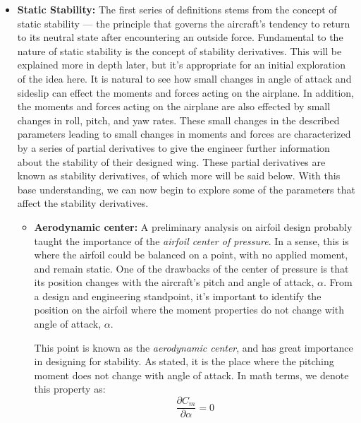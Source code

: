\documentclass{article}
\begin{document}
\begin{itemize}
    \item[] \textbf{Static Stability:}
    The first series of definitions stems from the concept of static stability --- the principle that governs the aircraft's tendency to return to its neutral state after encountering an outside force. Fundamental to the nature of static stability is the concept of stability derivatives. This will be explained more in depth later, but it's appropriate for an initial exploration of the idea here.
    It is natural to see how small changes in angle of attack and sideslip can effect the moments and forces acting on the airplane. In addition, the moments and forces acting on the airplane are also effected by small changes in roll, pitch, and yaw rates. These small changes in the described parameters leading to small changes in moments and forces are characterized by a series of partial derivatives to give the engineer further information about the stability of their designed wing.
    These partial derivatives are known as stability derivatives, of which more will be said below. With this base understanding, we can now begin to explore some of the parameters that affect the stability derivatives.
        \begin{itemize}
            \item[] \textbf{Aerodynamic center:} A preliminary analysis on airfoil design probably taught the importance of the \textit{airfoil center of pressure}. In a sense, this is where the airfoil could be balanced on a point, with no applied moment, and remain static.
            One of the drawbacks of the center of pressure is that its position changes with the aircraft's pitch and angle of attack, $\alpha$. From a design and engineering standpoint, it's important to identify the position on the airfoil where the moment properties do not change with angle of attack, $\alpha$.
            
            This point is known as the \textit{aerodynamic center}, and has great importance in designing for stability. As stated, it is the place where the pitching moment does not change with angle of attack. In math terms, we denote this property as:
            \begin{equation}\label{eq:aerodynamic_center_condition}
                \frac{\partial C_m}{\partial \alpha} = 0
            \end{equation}


\end{itemize}
\end{itemize}
\end{document}
